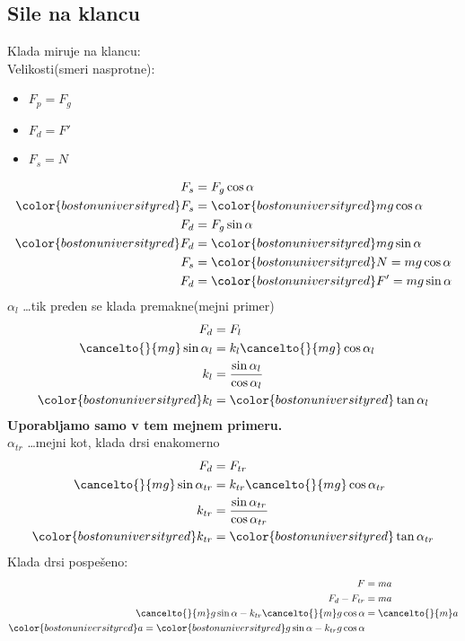 {\color{indiagreen}\subsection{Sile na klancu}}
Klada miruje na klancu:\\
Velikosti(smeri nasprotne):
\begin{itemize}
	\item $F_p=F_g$
	\item $F_d=F'$
	\item $F_s=N$
\end{itemize}
\begin{align*}
	F_s &= F_g \cos \alpha\\
	{\color{bostonuniversityred}F_s} &= {\color{bostonuniversityred}mg\cos \alpha}\\
	F_d &= F_g\sin \alpha\\
	{\color{bostonuniversityred}F_d} &= {\color{bostonuniversityred}mg\sin \alpha}\\
	F_s &={\color{bostonuniversityred} N = mg\cos \alpha}\\
	F_d &={\color{bostonuniversityred} F' = mg\sin \alpha}\\
\end{align*}
$\alpha_l$ \dots tik preden se klada premakne(mejni primer)\\
\begin{align*}
	F_d &= F_l\\
	{\cancelto{}{mg}}\sin\alpha_l &= k_l{\cancelto{}{mg}}\cos\alpha_l\\
	k_l &= \frac{\sin\alpha_l}{\cos\alpha_l}\\
	{\color{bostonuniversityred}k_l} &= {\color{bostonuniversityred}\tan\alpha_l}\\
\end{align*}
\textbf{Uporabljamo samo v tem mejnem primeru.}\\
$\alpha_{tr}$ \dots mejni kot, klada drsi enakomerno\\
\begin{align*}
	F_d &= F_{tr}\\
	{\cancelto{}{mg}}\sin\alpha_{tr} &= k_{tr}{\cancelto{}{mg}}\cos\alpha_{tr}\\
	k_{tr} &= \frac{\sin\alpha_{tr}}{\cos\alpha_{tr}}\\
	{\color{bostonuniversityred}k_{tr}} &= {\color{bostonuniversityred}\tan\alpha_{tr}}\\
\end{align*}
Klada drsi pospešeno:
\begin{align*}
	F &= ma\\
	F_d - F_{tr} &= ma\\
	{\cancelto{}{m}}g\sin\alpha - k_{tr}{\cancelto{}{m}}g\cos\alpha &={\cancelto{}{m}}a\\
	{\color{bostonuniversityred}a} = {\color{bostonuniversityred}g\sin\alpha - k_{tr}g\cos\alpha}
\end{align*}
